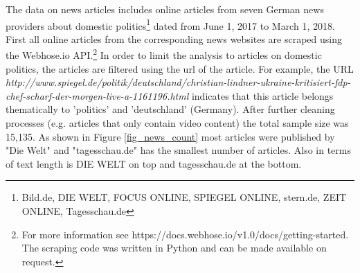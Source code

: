 \documentclass[12pt,a4paper,notitlepage]{article}
\begin{document}
%

The data on news articles includes online articles from seven German news providers about domestic politics\footnote{Bild.de, DIE WELT, FOCUS ONLINE, SPIEGEL ONLINE, stern.de, ZEIT ONLINE, Tagesschau.de} dated from June 1, 2017 to March 1, 2018. First all online articles from the corresponding news websites are scraped using the Webhose.io API.\footnote{For more information see https://docs.webhose.io/v1.0/docs/getting-started. The scraping code was written in Python and can be made available on request.} In order to limit the analysis to articles on domestic politics, the articles are filtered using the url of the article. For example, the URL \textit{http://www.spiegel.de/politik/deutschland/christian-lindner-ukraine-kritisiert-fdp-chef-scharf-der-morgen-live-a-1161196.html} indicates that this article belongs thematically to 'politics' and 'deutschland' (Germany). After further cleaning processes (e.g. articles that only contain video content) the total sample size was 15,135. As shown in Figure \ref{fig_news_count} most articles were published by "Die Welt" and "tagesschau.de" has the smallest number of articles. Also in terms of text length is DIE WELT on top and tagesschau.de at the bottom. 
\end{document}
